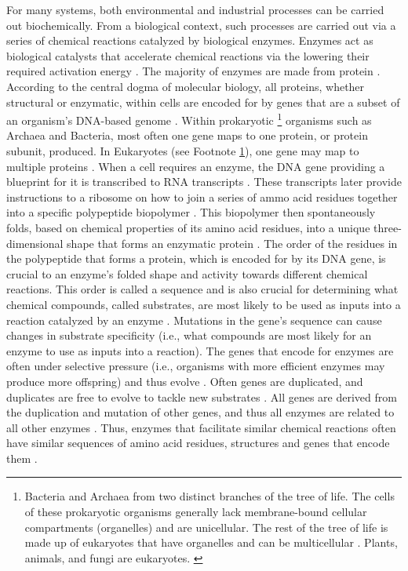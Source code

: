 For many systems, both environmental and industrial processes can be carried out biochemically. From a biological context, such processes are carried out via a series of chemical reactions catalyzed by biological enzymes. Enzymes act as biological catalysts that accelerate chemical reactions via the lowering their required activation energy \cite{segel1975enzyme}. The majority of enzymes are made from protein \cite{kruger1982self}. According to the central dogma of molecular biology, all proteins, whether structural or enzymatic, within cells are encoded for by genes that are a subset of an organism's DNA-based genome \cite{crick1970central}. Within prokaryotic \footnote{Bacteria and Archaea from two distinct branches of the tree of life. The cells of these prokaryotic organisms generally\cite{nevo2007thylakoid,cameron2013biogenesis,bazylinski2004magnetosome,van2008combined,adams2000heterocyst,o2000biofilm} lack membrane-bound cellular compartments (organelles) and are unicellular. The rest of the tree of life is made up of eukaryotes that have organelles and can be multicellular \cite{baldauf2003deep}. Plants, animals, and fungi are eukaryotes. \label{types-of-cells}} organisms such as Archaea and Bacteria, most often one gene maps to one protein, or protein subunit, produced. In Eukaryotes (see Footnote \ref{types-of-cells}), one gene may map to multiple proteins \cite{black2003mechanisms}. When a cell requires an enzyme, the DNA gene providing a blueprint for it is transcribed to RNA transcripts \cite{crick1970central}. These transcripts later provide instructions to a ribosome on how to join a series of ammo acid residues together into a specific polypeptide biopolymer \cite{crick1970central}. This biopolymer then spontaneously folds, based on chemical properties of its amino acid residues, into a unique three-dimensional shape that forms an enzymatic protein \cite{fersht1992folding}. The order of the residues in the polypeptide that forms a protein, which is encoded for by its DNA gene, is crucial to an enzyme's folded shape and activity towards different chemical reactions. This order is called a sequence and is also crucial for determining what chemical compounds, called substrates, are most likely to be used as inputs into a reaction catalyzed by an enzyme \cite{fersht1992folding,fersht1999structure}. Mutations in the gene's sequence can cause changes in substrate specificity (i.e., what compounds are most likely for an enzyme to use as inputs into a reaction). The genes that encode for enzymes are often under selective pressure (i.e., organisms with more efficient enzymes may produce more offspring) and thus evolve \cite{zhang2003evolution,whelan2001general}. Often genes are duplicated, and duplicates are free to evolve to tackle new substrates \cite{zhang2003evolution}. All genes are derived from the duplication and mutation of other genes, and thus all enzymes are related to all other enzymes \cite{zhang2003evolution,whelan2001general}. Thus, enzymes that facilitate similar chemical reactions often \cite{galperin1998analogous} have similar sequences of amino acid residues, structures and genes that encode them \cite{zhang2003evolution}.


